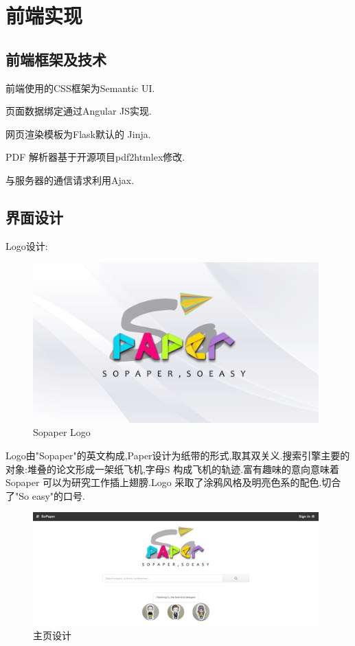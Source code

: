\section{前端实现}

\subsection{前端框架及技术}

前端使用的CSS框架为Semantic UI.

页面数据绑定通过Angular JS实现.

网页渲染模板为Flask默认的 Jinja.

PDF 解析器基于开源项目pdf2htmlex修改.

与服务器的通信请求利用Ajax.

\subsection{界面设计}

Logo设计:

\begin{figure}[H]
  \small
  \centering
  \includegraphics[width=11cm]{img/logo.png}
  \caption{Sopaper Logo}
\end{figure}

Logo由"Sopaper"的英文构成,Paper设计为纸带的形式,取其双关义.搜索引擎主要的对象:堆叠的论文形成一架纸飞机,字母S 构成飞机的轨迹.富有趣味的意向意味着Sopaper 可以为研究工作插上翅膀.Logo 采取了涂鸦风格及明亮色系的配色.切合了"So easy"的口号.

\begin{figure}[H]
  \small
  \centering
  \includegraphics[width=11cm]{img/index.png}
  \caption{主页设计}
\end{figure}

